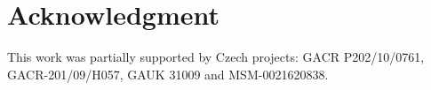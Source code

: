 \documentclass[10pt, conference, compsocconf]{IEEEtran}
\begin{document}
%






\section*{Acknowledgment}
This work was partially supported by Czech projects: GACR P202/10/0761, GACR-201/09/H057, GAUK 31009 and MSM-0021620838.







\end{document}
